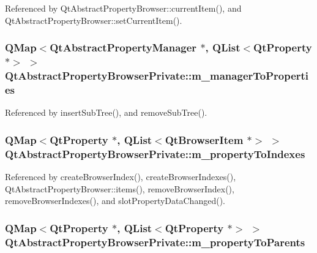 Referenced by Qt\+Abstract\+Property\+Browser\+::current\+Item(), and Qt\+Abstract\+Property\+Browser\+::set\+Current\+Item().

\subsubsection[{m\+\_\+manager\+To\+Properties}]{\setlength{\rightskip}{0pt plus 5cm}Q\+Map$<${\bf Qt\+Abstract\+Property\+Manager} $\ast$, Q\+List$<${\bf Qt\+Property} $\ast$$>$ $>$ Qt\+Abstract\+Property\+Browser\+Private\+::m\+\_\+manager\+To\+Properties}\label{classQtAbstractPropertyBrowserPrivate_a69412f4158927d5bb8c3cc6a1e491005}


Referenced by insert\+Sub\+Tree(), and remove\+Sub\+Tree().

\subsubsection[{m\+\_\+property\+To\+Indexes}]{\setlength{\rightskip}{0pt plus 5cm}Q\+Map$<${\bf Qt\+Property} $\ast$, Q\+List$<${\bf Qt\+Browser\+Item} $\ast$$>$ $>$ Qt\+Abstract\+Property\+Browser\+Private\+::m\+\_\+property\+To\+Indexes}\label{classQtAbstractPropertyBrowserPrivate_a24752097b0dd4b8fcd4a48c5fc049c4b}


Referenced by create\+Browser\+Index(), create\+Browser\+Indexes(), Qt\+Abstract\+Property\+Browser\+::items(), remove\+Browser\+Index(), remove\+Browser\+Indexes(), and slot\+Property\+Data\+Changed().

\subsubsection[{m\+\_\+property\+To\+Parents}]{\setlength{\rightskip}{0pt plus 5cm}Q\+Map$<${\bf Qt\+Property} $\ast$, Q\+List$<${\bf Qt\+Property} $\ast$$>$ $>$ Qt\+Abstract\+Property\+Browser\+Private\+::m\+\_\+property\+To\+Parents}\label{classQtAbstractPropertyBrowserPrivate_a29ef0c659d608f04916a2cd752126758}


